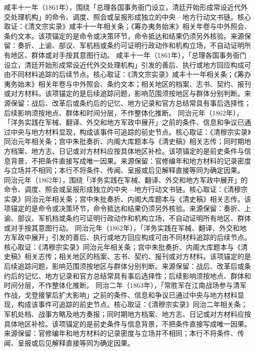 咸丰十一年（1861年），围绕「总理各国事务衙门设立，清廷开始形成常设近代外交处理机构」的命令、调度、照会或呈报形成独立的中央—地方行动文书链。核心取证：《清文宗实录》咸丰十一年相关条；《筹办夷务始末》相关年卷与中外照会、条约文本。该项锚定的是命令或决策环节，命令抵达和结果仍须另外核验。来源保留：奏折、上谕、部议、军机档或条约可证明行政动作和机构立场，不自动证明所有地区、群体或对手按其意图行动。
咸丰十一年（1861年），「总理各国事务衙门设立，清廷开始形成常设近代外交处理机构」引发的善后、执行或地方回应构成可由不同材料追踪的后续节点。核心取证：《清文宗实录》咸丰十一年相关条；《筹办夷务始末》相关年卷与中外照会、条约文本；相关地区的档案、志书、契约、报刊或对方材料。该项锚定的是后续追踪问题，影响范围须按地区与群体分别判断。来源保留：战后、改革后或条约后的记忆、地方记录和官方总结常具有事后选择性；后续影响须按地点、群体和时间分层，不作整体化推断。
同治元年（1862年），「洋务实践在军械、翻译、外交和地方军政中展开」之前的条件、信息和争议已通过中央与地方材料显现，构成该事件可追踪的前史节点。核心取证：《清穆宗实录》同治元年相关条；宫中朱批奏折、内阁大库题本与《清史稿》相关志传；同时期地方档案、地方志、日记或对方材料应按具体地区补检。该项锚定的是前史条件与信息背景，不把条件直接写成唯一因果。来源保留：官修编年和地方材料的记录密度与立场并不相同；本行不将条件、传闻、呈报或后见解释直接等同为确定因果。
同治元年（1862年），围绕「洋务实践在军械、翻译、外交和地方军政中展开」的命令、调度、照会或呈报形成独立的中央—地方行动文书链。核心取证：《清穆宗实录》同治元年相关条；宫中朱批奏折、内阁大库题本与《清史稿》相关志传。该项锚定的是命令或决策环节，命令抵达和结果仍须另外核验。来源保留：奏折、上谕、部议、军机档或条约可证明行政动作和机构立场，不自动证明所有地区、群体或对手按其意图行动。
同治元年（1862年），「洋务实践在军械、翻译、外交和地方军政中展开」引发的善后、执行或地方回应构成可由不同材料追踪的后续节点。核心取证：《清穆宗实录》同治元年相关条；宫中朱批奏折、内阁大库题本与《清史稿》相关志传；相关地区的档案、志书、契约、报刊或对方材料。该项锚定的是后续追踪问题，影响范围须按地区与群体分别判断。来源保留：战后、改革后或条约后的记忆、地方记录和官方总结常具有事后选择性；后续影响须按地点、群体和时间分层，不作整体化推断。
同治二年（1863年），「常胜军在江南战场参与清军作战，戈登接掌后扩大影响」之前的条件、信息和争议已通过中央与地方材料显现，构成该事件可追踪的前史节点。核心取证：《清穆宗实录》同治二年相关条；军机处档、战事方略及地方奏报；同时期地方档案、地方志、日记或对方材料应按具体地区补检。该项锚定的是前史条件与信息背景，不把条件直接写成唯一因果。来源保留：官修编年和地方材料的记录密度与立场并不相同；本行不将条件、传闻、呈报或后见解释直接等同为确定因果。
